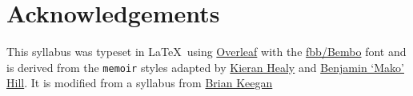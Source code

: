 \documentclass[10pt]{memoir}
\begin{document}
\section{\textbf{Acknowledgements}}

This syllabus was typeset in \LaTeX~using \href{http://www.sharelatex.com}{Overleaf} with the \href{http://www.tug.dk/FontCatalogue/fbb/}{fbb/Bembo} font and is derived from the \texttt{memoir} styles adapted by \href{https://github.com/kjhealy/latex-custom-kjh}{Kieran Healy} and \href{http://projects.mako.cc/source/?p=latex_mako;a=summary}{Benjamin `Mako' Hill}. It is modified from a syllabus from \href{https://www.brianckeegan.com/}{Brian Keegan} 



\renewcommand{\bibsection}{\section{\huge \bibname}\prebibhook}
\baselineskip 14.2pt

\end{document}
